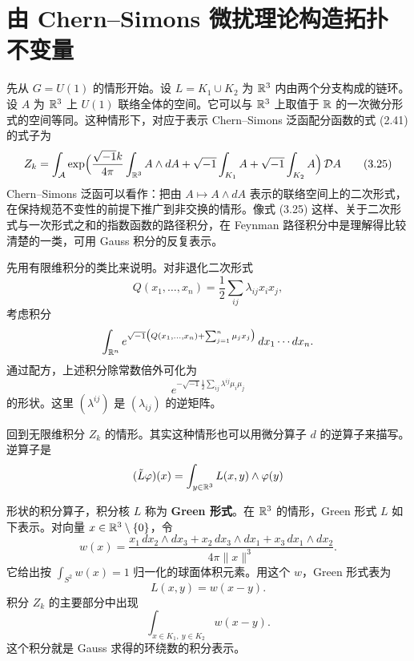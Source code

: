 
\section{由 Chern--Simons 微扰理论构造拓扑不变量}


先从 $G=U(1)$ 的情形开始。设 $L=K_1\cup K_2$ 为 $\mathbb{R}^{3}$ 内由两个分支构成的链环。设 $A$ 为 $\mathbb{R}^{3}$ 上 $U(1)$ 联络全体的空间。它可以与 $\mathbb{R}^{3}$ 上取值于 $\mathbb{R}$ 的一次微分形式的空间等同。这种情形下，对应于表示 Chern--Simons 泛函配分函数的式 (2.41) 的式子为
\begin{equation}
  Z_k=\int_{\mathcal{A}}\exp\Bigl(\frac{\sqrt{-1}k}{4\pi}\int_{\mathbb{R}^{3}}A\wedge dA
  +\sqrt{-1}\int_{K_1}A+\sqrt{-1}\int_{K_2}A\Bigr)\,\mathcal{D}A \tag{3.25}
\end{equation}
Chern--Simons 泛函可以看作：把由 $A\mapsto A\wedge dA$ 表示的联络空间上的二次形式，在保持规范不变性的前提下推广到非交换的情形。像式 (3.25) 这样、关于二次形式与一次形式之和的指数函数的路径积分，在 Feynman 路径积分中是理解得比较清楚的一类，可用 Gauss 积分的反复表示。

先用有限维积分的类比来说明。对非退化二次形式
\[
  Q(x_1,\dots,x_n)=\frac{1}{2}\sum_{ij}\lambda_{ij}x_ix_j,
\]
考虑积分
\[
  \int_{\mathbb{R}^{n}}e^{\sqrt{-1}\bigl(Q(x_1,\dots,x_n)+\sum_{j=1}^{n}\mu_jx_j\bigr)}\,dx_1\cdots dx_n .
\]
通过配方，上述积分除常数倍外可化为
\[
  e^{-\sqrt{-1}\frac{1}{2}\sum_{ij}\lambda^{ij}\mu_i\mu_j}
\]
的形状。这里 $(\lambda^{ij})$ 是 $(\lambda_{ij})$ 的逆矩阵。

回到无限维积分 $Z_k$ 的情形。其实这种情形也可以用微分算子 $d$ 的逆算子来描写。逆算子是
\[
  (\tilde L\varphi)(x)=\int_{y\in\mathbb{R}^{3}}L(x,y)\wedge\varphi(y)
\]

形状的积分算子，积分核 $L$ 称为 \textbf{Green 形式}。在 $\mathbb{R}^{3}$ 的情形，Green 形式 $L$ 如下表示。对向量 $x\in\mathbb{R}^{3}\setminus\{0\}$，令
\begin{equation}
  w(x)=\frac{x_1\,dx_2\wedge dx_3+x_2\,dx_3\wedge dx_1+x_3\,dx_1\wedge dx_2}{4\pi\|x\|^{3}} . \tag{3.26}
\end{equation}
它给出按 $\int_{S^{2}}w(x)=1$ 归一化的球面体积元素。用这个 $w$，Green 形式表为
\[
  L(x,y)=w(x-y).
\]
积分 $Z_k$ 的主要部分中出现
\[
  \int_{x\in K_1,\ y\in K_2}w(x-y).
\]
这个积分就是 Gauss 求得的环绕数的积分表示。


